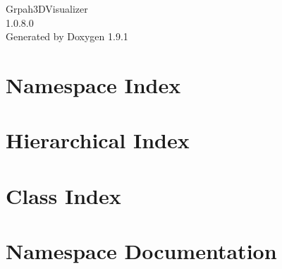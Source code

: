 \let\mypdfximage\pdfximage\def\pdfximage{\immediate\mypdfximage}\documentclass[twoside]{book}
\newcommand{\+}{\discretionary{\mbox{\scriptsize$\hookleftarrow$}}{}{}}
\newcommand{\clearemptydoublepage}{%
  \newpage{\pagestyle{empty}\cleardoublepage}%
}
\begin{document}
\raggedbottom

\hypersetup{pageanchor=false,
             bookmarksnumbered=true,
             pdfencoding=unicode
            }
\begin{titlepage}
\vspace*{7cm}
\begin{center}%
{\Large Grpah3\+DVisualizer \\[1ex]\large 1.\+0.\+8.\+0 }\\
\vspace*{1cm}
{\large Generated by Doxygen 1.9.1}\\
\end{center}
\end{titlepage}
\clearemptydoublepage
{}
\tableofcontents
\clearemptydoublepage
{}
\hypersetup{pageanchor=true}

\chapter{Namespace Index}

\chapter{Hierarchical Index}

\chapter{Class Index}

\chapter{Namespace Documentation}












\end{document}
